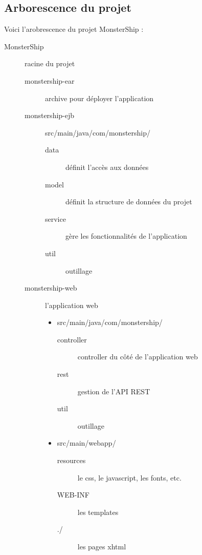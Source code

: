 \documentclass[a4paper,11pt]{report}
\begin{document}
    \subsection{Arborescence du projet}
      Voici l'arobrescence du projet MonsterShip :
      \begin{description}
        \item[MonsterShip] racine du projet
        \begin{description}
          \item[monstership-ear] archive pour déployer l'application
          \item[monstership-ejb] src/main/java/com/monstership/
          \begin{description}
            \item[data] définit l'accès aux données
            \item[model] définit la structure de données du projet
            \item[service] gère les fonctionnalités de l'application 
            \item[util] outillage
          \end{description}
          \item[monstership-web] l'application web
          \begin{itemize}
            \item src/main/java/com/monstership/
            \begin{description}
              \item[controller] controller du côté de l'application web
              \item[rest] gestion de l'API REST
              \item[util] outillage
            \end{description}
            \item src/main/webapp/
            \begin{description}
              \item[resources] le css, le javascript, les fonts, etc.
              \item[WEB-INF] les templates
              \item[./] les pages xhtml
            \end{description}
          \end{itemize}
        \end{description}
      \end{description}
\end{document}

